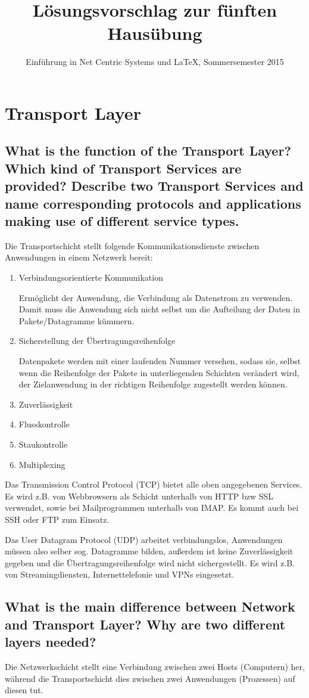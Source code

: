 \documentclass[a4paper,
			llpt,
			solution,
			accentcolor=tud2d,
			colorbacktitle
			]
			{tudexercise}
\title{Lösungsvorschlag zur fünften Hausübung}
\subtitle{Einführung in Net Centric Systems und \LaTeX, Sommersemester 2015}
\begin{document}
\maketitle
\section{Transport Layer}
\subsection{What is the function of the Transport Layer? Which kind of Transport Services are provided? Describe two Transport Services and name corresponding protocols and applications making use of different service types.}
Die Transportschicht stellt folgende Kommunikationsdienste zwischen Anwendungen in einem Netzwerk bereit:
\begin{enumerate}
	\item Verbindungsorientierte Kommunikation

	Ermöglicht der Anwendung, die Verbindung als Datenstrom zu verwenden. Damit muss die Anwendung sich nicht selbst um die Aufteilung der Daten in Pakete/Datagramme kümmern.
	\item Sicherstellung der Übertragungsreihenfolge

	Datenpakete werden mit einer laufenden Nummer versehen, sodass sie, selbst wenn die Reihenfolge der Pakete in unterliegenden Schichten verändert wird, der Zielanwendung in der richtigen Reihenfolge zugestellt werden können.
	\item Zuverlässigkeit
	\item Flusskontrolle
	\item Staukontrolle
	\item Multiplexing
\end{enumerate}
Das Transmission Control Protocol (TCP) bietet alle oben angegebenen Services. Es wird z.B. von Webbrowsern als Schicht unterhalb von HTTP bzw SSL verwendet, sowie bei Mailprogrammen unterhalb von IMAP. Es kommt auch bei SSH oder FTP zum Einsatz.

Das User Datagram Protocol (UDP) arbeitet verbindungslos, Anwendungen müssen also selber sog. Datagramme bilden, außerdem ist keine Zuverlässigkeit gegeben und die Übertragungsreihenfolge wird nicht sichergestellt. Es wird z.B. von Streamingdiensten, Internettelefonie und VPNs eingesetzt.


\subsection{What is the main difference between Network and Transport Layer? Why are two different layers needed?}
Die Netzwerkschicht stellt eine Verbindung zwischen zwei Hosts (Computern) her, während die Transportschicht dies zwischen zwei Anwendungen (Prozessen) auf diesen tut.
\end{document}
